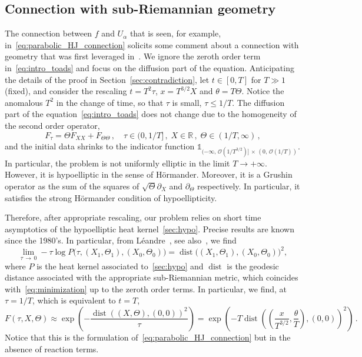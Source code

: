 \documentclass[10pt]{amsart}
\theoremstyle{definition}\newtheorem{defi}[theo]{Definition}\newtheorem{rema}[theo]{Remark}\newtheorem{exam}[theo]{Example}\newtheorem{exem}[theo]{Example}\newtheorem{nota}[theo]{Notation}
\DeclareMathOperator{\dist}{dist}
\newcommand{\R}{\mathbb{R}}
\newcommand{\mO}{\mathcal{O}}
\newcommand{\1}{\mathds{1}}
\begin{document}
\subsection*{Connection with sub-Riemannian geometry}

The connection between $f$ and $U_\alpha$ that is seen, for example, in~\eqref{eq:parabolic_HJ_connection} solicits some comment about a connection with geometry that was first leveraged in~\cite{BouinChanHendersonKim}. We ignore the zeroth order term in~\eqref{eq:intro_toads} and focus on the diffusion part of the equation. Anticipating the details of the proof in Section~\ref{sec:contradiction}, let $t\in [0,T]$ for $T\gg1$ (fixed), and consider the rescaling $t = T^2\tau$, $x = T^{3/2} X $ and $\theta = T \Theta $. Notice the anomalous $T^2$ in the change of time, so that $\tau$ is small, $\tau\leq 1/T$. The diffusion part of the equation~\eqref{eq:intro_toads} does not change due to the homogeneity of the second order operator,
\begin{equation}\label{sec:hypo}
F_{\tau} = \Theta F_{XX} + F_{\Theta\Theta}\,,
\quad \tau\in (0,1/T]\,,
\;X\in \R \,,
\; \Theta\in (1/T,\infty) \,,
\end{equation}
and the initial data shrinks to the indicator function $\1_{(-\infty,\,\mO(1/T^{3/2})]\,\times\,(0,\,\mO(1/T))}$. In particular, the problem is not uniformly elliptic in the limit $T\to +\infty$. However, it is hypoelliptic in the sense of H\"ormander. Moreover, it is a Grushin operator as the sum of the squares of $\sqrt{\Theta} \partial_X$ and $\partial_\Theta$ respectively. In particular, it satisfies the strong H\"ormander condition of hypoellipticity.



Therefore, after appropriate rescaling, our problem relies on short time asymptotics of the hypoelliptic heat kernel~\eqref{sec:hypo}. Precise results are known since the 1980's. In particular, from Léandre~\cite{leandre_majoration_1987,leandre_minoration_1987}, see also~\cite{ben_arous_developpement_1988}, we find
\[
\lim_{\tau\,\to\,0} -\tau \log P\big(\tau,(X_1,\Theta_1),(X_0,\Theta_0)\big) = \dist\big((X_1,\Theta_1),(X_0,\Theta_0)\big)^2,
\]
where $P$ is the heat kernel associated to~\eqref{sec:hypo} and $\dist$ is the geodesic distance associated with the appropriate sub-Riemannian metric, which coincides with~\eqref{eq:minimization} up to the zeroth order terms. In particular, we find, at $\tau = 1/T$, which is equivalent to $t=T$,
\[
F(\tau,X, \Theta) \approx \exp\left(- \frac{\dist((X,\Theta), (0,0))^2}{\tau}\right) = \exp\left(- T \dist\left(\left(\frac{x}{T^{3/2}}, \frac{\theta}{T}\right), (0,0)\right)^2\right)\,.
\]
Notice that this is the formulation of~\eqref{eq:parabolic_HJ_connection} but in the absence of reaction terms.
\end{document}

